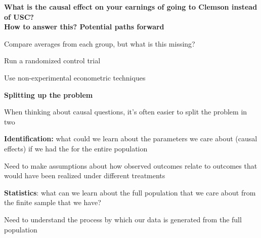 \documentclass[11pt, aspectratio=169]{beamer}
\newenvironment{wideitemize}{\itemize\addtolength{\itemsep}{5pt}}{\enditemize}
\newenvironment{wideenumerate}{\enumerate\addtolength{\itemsep}{5pt}}{\endenumerate}
\begin{document}
\begin{frame}{\bf \large What is the causal effect on your earnings of going to Clemson instead of USC? \\ {\normalsize How to answer this? Potential paths forward}}
\begin{wideenumerate}
	\item Compare averages from each group, but what is this missing?
	\item Run a randomized control trial
	\item Use non-experimental econometric techniques
\end{wideenumerate}
\end{frame}


\begin{frame}[label=splitprob]{\bf \large Splitting up the problem}
	\begin{wideitemize}
		
		\item
		When thinking about causal questions, it's often easier to split the problem in two
		
		\item
		\textbf{Identification:} what could we learn about the parameters we care about (causal effects) if we had the  for the entire population
		\begin{wideitemize}
			\item 
			Need to make assumptions about how observed outcomes relate to outcomes that would have been realized under different treatments
		\end{wideitemize}
		
		\item
		\textbf{Statistics}: what can we learn about the full population that we care about from the finite sample that we have?
			\begin{wideitemize}
				\item 
				Need to understand the process by which our data is generated from the full population
			\end{wideitemize} 	
		
	\end{wideitemize}	
	
\hyperlink{framework}{}	
\end{frame}
\end{document}
